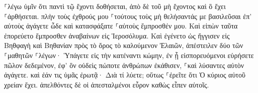 \documentclass{openreader}
\begin{document}
⸀λέγω ὑμῖν ὅτι παντὶ τῷ ἔχοντι δοθήσεται, ἀπὸ δὲ τοῦ μὴ ἔχοντος καὶ ὃ ἔχει ⸀ἀρθήσεται. 
πλὴν τοὺς ἐχθρούς μου ⸀τούτους τοὺς μὴ θελήσαντάς με βασιλεῦσαι ἐπ’ αὐτοὺς ἀγάγετε ὧδε καὶ κατασφάξατε ⸀αὐτοὺς ἔμπροσθέν μου. 
Καὶ εἰπὼν ταῦτα ἐπορεύετο ἔμπροσθεν ἀναβαίνων εἰς Ἱεροσόλυμα. 
Καὶ ἐγένετο ὡς ἤγγισεν εἰς Βηθφαγὴ καὶ Βηθανίαν πρὸς τὸ ὄρος τὸ καλούμενον Ἐλαιῶν, ἀπέστειλεν δύο τῶν ⸀μαθητῶν 
⸀λέγων· Ὑπάγετε εἰς τὴν κατέναντι κώμην, ἐν ᾗ εἰσπορευόμενοι εὑρήσετε πῶλον δεδεμένον, ἐφ’ ὃν οὐδεὶς πώποτε ἀνθρώπων ἐκάθισεν, ⸀καὶ λύσαντες αὐτὸν ἀγάγετε. 
καὶ ἐάν τις ὑμᾶς ἐρωτᾷ· Διὰ τί λύετε; οὕτως ⸀ἐρεῖτε ὅτι Ὁ κύριος αὐτοῦ χρείαν ἔχει. 
ἀπελθόντες δὲ οἱ ἀπεσταλμένοι εὗρον καθὼς εἶπεν αὐτοῖς. 
\end{document}
